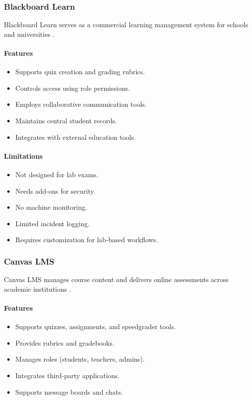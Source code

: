 \subsubsection{Blackboard Learn}
Blackboard Learn serves as a commercial learning management system for schools and universities \cite{blackboard1}.

\paragraph{Features}
\begin{itemize}[noitemsep]
\item Supports quiz creation and grading rubrics.
\item Controls access using role permissions.
\item Employs collaborative communication tools.
\item Maintains central student records.
\item Integrates with external education tools.
\end{itemize}

\paragraph{Limitations}
\begin{itemize}[noitemsep]
\item Not designed for lab exams.
\item Needs add-ons for security.
\item No machine monitoring.
\item Limited incident logging.
\item Requires customization for lab-based workflows.
\end{itemize}

\subsubsection{Canvas LMS}
Canvas LMS manages course content and delivers online assessments across academic institutions \cite{canvas1}.

\paragraph{Features}
\begin{itemize}[noitemsep]
\item Supports quizzes, assignments, and speedgrader tools.
\item Provides rubrics and gradebooks.
\item Manages roles (students, teachers, admins).
\item Integrates third-party applications.
\item Supports message boards and chats.
\end{itemize}

